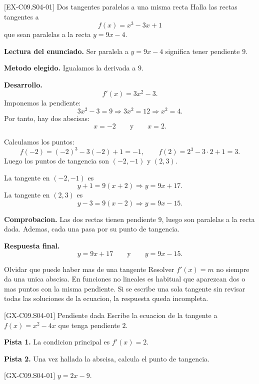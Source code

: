 \begin{solvedexample}{[EX-C09.S04-01] Dos tangentes paralelas a una misma recta}
Halla las rectas tangentes a
\[
f(x)=x^3-3x+1
\]
que sean paralelas a la recta \(y=9x-4\).

\textbf{Lectura del enunciado.} Ser paralela a \(y=9x-4\) significa tener pendiente \(9\).

\textbf{Metodo elegido.} Igualamos la derivada a \(9\).

\textbf{Desarrollo.}
\[
f'(x)=3x^2-3.
\]
Imponemos la pendiente:
\[
3x^2-3=9 \Longrightarrow 3x^2=12 \Longrightarrow x^2=4.
\]
Por tanto, hay dos abscisas:
\[
x=-2 \qquad\text{y}\qquad x=2.
\]

Calculamos los puntos:
\[
f(-2)=(-2)^3-3(-2)+1=-1,
\qquad
f(2)=2^3-3\cdot 2+1=3.
\]
Luego los puntos de tangencia son \((-2,-1)\) y \((2,3)\).

La tangente en \((-2,-1)\) es
\[
y+1=9(x+2)\Longrightarrow y=9x+17.
\]
La tangente en \((2,3)\) es
\[
y-3=9(x-2)\Longrightarrow y=9x-15.
\]

\textbf{Comprobacion.} Las dos rectas tienen pendiente \(9\), luego son paralelas a la recta
dada. Ademas, cada una pasa por su punto de tangencia.

\textbf{Respuesta final.}
\[
\boxed{y=9x+17}
\qquad\text{y}\qquad
\boxed{y=9x-15}.
\]
\end{solvedexample}

\begin{commonerror}{Olvidar que puede haber mas de una tangente}
Resolver \(f'(x)=m\) no siempre da una unica abscisa. En funciones no lineales es habitual que
aparezcan dos o mas puntos con la misma pendiente. Si se escribe una sola tangente sin revisar
todas las soluciones de la ecuacion, la respuesta queda incompleta.
\end{commonerror}

\begin{guidedexercise}{[GX-C09.S04-01] Pendiente dada}
Escribe la ecuacion de la tangente a \(f(x)=x^2-4x\) que tenga pendiente \(2\).

\textbf{Pista 1.} La condicion principal es \(f'(x)=2\).

\textbf{Pista 2.} Una vez hallada la abscisa, calcula el punto de tangencia.
\end{guidedexercise}

\begin{shortanswer}{[GX-C09.S04-01]}
\(y=2x-9\).
\end{shortanswer}

